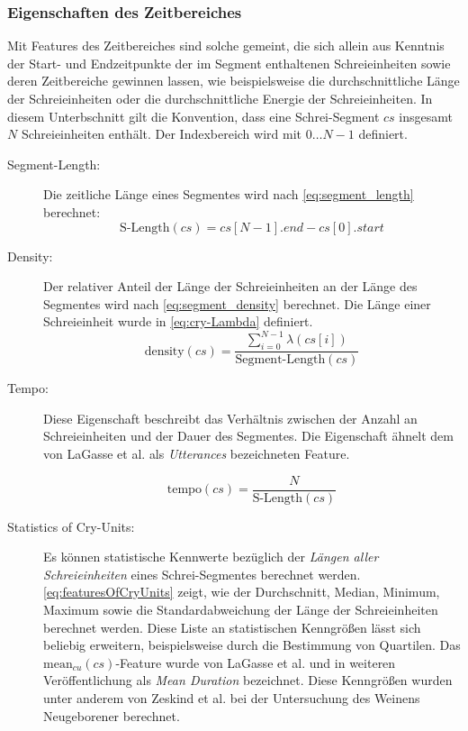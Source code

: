 \subsubsection{Eigenschaften des Zeitbereiches}

Mit Features des Zeitbereiches sind solche gemeint, die sich allein aus Kenntnis der Start- und Endzeitpunkte der im Segment enthaltenen Schreieinheiten sowie deren Zeitbereiche gewinnen lassen, wie beispielsweise die durchschnittliche Länge der Schreieinheiten oder die durchschnittliche Energie der Schreieinheiten.\cite[S. 16 - 17]{cry_thesis} In diesem Unterbschnitt gilt die Konvention, dass eine Schrei-Segment $cs$ insgesamt $N$ Schreieinheiten enthält. Der Indexbereich wird mit $0 \ldots N-1$ definiert.

\begin{description}
\item[Segment-Length: ] Die zeitliche Länge eines Segmentes wird nach \autoref{eq:segment_length} berechnet:
\begin{equation}
\text{S-Length}(cs) = cs[N-1].end - cs[0].start
\label{eq:segment_length}
\end{equation}

\item[Density: ] Der relativer Anteil der Länge der Schreieinheiten an der Länge des Segmentes wird nach \autoref{eq:segment_density} berechnet. Die Länge einer Schreieinheit wurde in \autoref{eq:cry-Lambda} definiert.
\begin{equation}
\text{density}(cs) = \frac{\sum_{i = 0}^{N-1} \lambda(cs[i])}{\text{Segment-Length}(cs)}
\label{eq:segment_density}
\end{equation}

\pagebreak

\item[Tempo:] Diese Eigenschaft beschreibt das Verhältnis zwischen der Anzahl an Schreieinheiten und der Dauer des Segmentes. Die Eigenschaft ähnelt dem von LaGasse et al. \cite[S. 85]{parentalPerception} als \emph{Utterances} bezeichneten Feature.

\begin{equation}
\text{tempo}(cs) =  \frac{N}{\text{S-Length}(cs)}
\end{equation}

\item[Statistics of Cry-Units:] Es können statistische Kennwerte bezüglich der \emph{Längen aller Schreieinheiten} eines Schrei-Segmentes berechnet werden. \autoref{eq:featuresOfCryUnits} zeigt, wie der Durchschnitt, Median, Minimum, Maximum sowie die Standardabweichung der Länge der Schreieinheiten berechnet werden. Diese Liste an statistischen Kenngrößen lässt sich beliebig erweitern, beispielsweise durch die Bestimmung von Quartilen. Das $\text{mean}_{cu}(cs)$-Feature wurde von LaGasse et al. \cite[S. 85]{parentalPerception} und in weiteren Veröffentlichung als \emph{Mean Duration} bezeichnet. Diese Kenngrößen wurden unter anderem von Zeskind et al. \cite{rythmic} bei der Untersuchung des Weinens Neugeborener berechnet.


\end{description}
